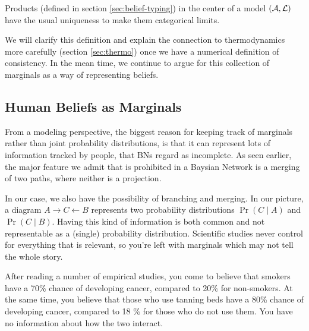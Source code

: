 \documentclass{article}
\begin{document}
	\begin{conj}
		Products (defined in section \ref{sec:belief-typing}) in the center of a model $(\cal A, L)$ have the usual uniqueness to make them categorical limits.
	\end{conj}

	We will clarify this definition and explain the connection to thermodynamics more carefully (section \ref{sec:thermo}) once we have a numerical definition of consistency. In the mean time, we continue to argue for this collection of marginals as a way of representing beliefs.

	
	
	\subsection{Human Beliefs as Marginals}\label{sec:human-belief-marginals}
	From a modeling perspective, the biggest reason for keeping track of marginals rather than joint probability distributions, is that it can represent lots of information tracked by people, that BNs regard as incomplete. As seen earlier, the major feature we admit that is prohibited in a Baysian Network is a merging of two paths, where neither is a projection.
	
	In our case, we also have the possibility of branching and merging. In our picture, a diagram $A \rightarrow C \leftarrow B$ represents two probability distributions $\Pr(C\mid A)$ and $\Pr(C \mid B)$.
	Having this kind of information is both common and not representable as a (single) probability distribution. Scientific studies never control for everything that is relevant, so you're left with marginals which may not tell the whole story.
	
	\begin{example}
		After reading a number of empirical studies, you come to believe that smokers have a 70\% chance of developing cancer, compared to 20\% for non-smokers. At the same time, you believe that those who use tanning beds have a 80\% chance of developing cancer, compared to 18 \% for those who do not use them. You have no information about how the two interact.
	\end{example}
	
\end{document}
